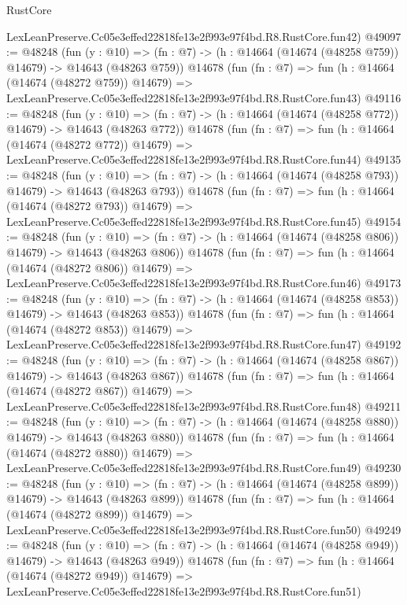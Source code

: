 \begin{lexlean}{RustCore}
\begin{coremodule}
    LexLeanPreserve.Cc05e3effed22818fe13e2f993e97f4bd.R8.RustCore.fun42)
@49097 := @48248
    (fun (y : @10) =>
    (fn : @7) -> (h : @14664 (@14674 (@48258 @759)) @14679) -> @14643 (@48263 @759))
    @14678
    (fun (fn : @7) =>
    fun (h : @14664 (@14674 (@48272 @759)) @14679) =>
    LexLeanPreserve.Cc05e3effed22818fe13e2f993e97f4bd.R8.RustCore.fun43)
@49116 := @48248
    (fun (y : @10) =>
    (fn : @7) -> (h : @14664 (@14674 (@48258 @772)) @14679) -> @14643 (@48263 @772))
    @14678
    (fun (fn : @7) =>
    fun (h : @14664 (@14674 (@48272 @772)) @14679) =>
    LexLeanPreserve.Cc05e3effed22818fe13e2f993e97f4bd.R8.RustCore.fun44)
@49135 := @48248
    (fun (y : @10) =>
    (fn : @7) -> (h : @14664 (@14674 (@48258 @793)) @14679) -> @14643 (@48263 @793))
    @14678
    (fun (fn : @7) =>
    fun (h : @14664 (@14674 (@48272 @793)) @14679) =>
    LexLeanPreserve.Cc05e3effed22818fe13e2f993e97f4bd.R8.RustCore.fun45)
@49154 := @48248
    (fun (y : @10) =>
    (fn : @7) -> (h : @14664 (@14674 (@48258 @806)) @14679) -> @14643 (@48263 @806))
    @14678
    (fun (fn : @7) =>
    fun (h : @14664 (@14674 (@48272 @806)) @14679) =>
    LexLeanPreserve.Cc05e3effed22818fe13e2f993e97f4bd.R8.RustCore.fun46)
@49173 := @48248
    (fun (y : @10) =>
    (fn : @7) -> (h : @14664 (@14674 (@48258 @853)) @14679) -> @14643 (@48263 @853))
    @14678
    (fun (fn : @7) =>
    fun (h : @14664 (@14674 (@48272 @853)) @14679) =>
    LexLeanPreserve.Cc05e3effed22818fe13e2f993e97f4bd.R8.RustCore.fun47)
@49192 := @48248
    (fun (y : @10) =>
    (fn : @7) -> (h : @14664 (@14674 (@48258 @867)) @14679) -> @14643 (@48263 @867))
    @14678
    (fun (fn : @7) =>
    fun (h : @14664 (@14674 (@48272 @867)) @14679) =>
    LexLeanPreserve.Cc05e3effed22818fe13e2f993e97f4bd.R8.RustCore.fun48)
@49211 := @48248
    (fun (y : @10) =>
    (fn : @7) -> (h : @14664 (@14674 (@48258 @880)) @14679) -> @14643 (@48263 @880))
    @14678
    (fun (fn : @7) =>
    fun (h : @14664 (@14674 (@48272 @880)) @14679) =>
    LexLeanPreserve.Cc05e3effed22818fe13e2f993e97f4bd.R8.RustCore.fun49)
@49230 := @48248
    (fun (y : @10) =>
    (fn : @7) -> (h : @14664 (@14674 (@48258 @899)) @14679) -> @14643 (@48263 @899))
    @14678
    (fun (fn : @7) =>
    fun (h : @14664 (@14674 (@48272 @899)) @14679) =>
    LexLeanPreserve.Cc05e3effed22818fe13e2f993e97f4bd.R8.RustCore.fun50)
@49249 := @48248
    (fun (y : @10) =>
    (fn : @7) -> (h : @14664 (@14674 (@48258 @949)) @14679) -> @14643 (@48263 @949))
    @14678
    (fun (fn : @7) =>
    fun (h : @14664 (@14674 (@48272 @949)) @14679) =>
    LexLeanPreserve.Cc05e3effed22818fe13e2f993e97f4bd.R8.RustCore.fun51)

\end{coremodule}
\end{lexlean}

